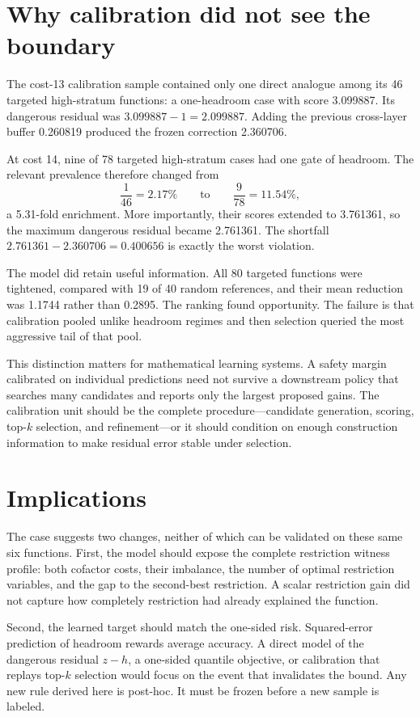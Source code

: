 \documentclass[11pt]{article}
\begin{document}
\section{Why calibration did not see the boundary}

The cost-13 calibration sample contained only one direct analogue among its
46 targeted high-stratum functions: a one-headroom case with score 3.099887.
Its dangerous residual was $3.099887-1=2.099887$.  Adding the previous
cross-layer buffer 0.260819 produced the frozen correction 2.360706.

At cost 14, nine of 78 targeted high-stratum cases had one gate of headroom.
The relevant prevalence therefore changed from
\[
 \frac{1}{46}=2.17\%\qquad\text{to}\qquad
 \frac{9}{78}=11.54\%,
\]
a 5.31-fold enrichment.  More importantly, their scores extended to 3.761361,
so the maximum dangerous residual became 2.761361.  The shortfall
$2.761361-2.360706=0.400656$ is exactly the worst violation.

The model did retain useful information.  All 80 targeted functions were
tightened, compared with 19 of 40 random references, and their mean reduction
was 1.1744 rather than 0.2895.  The ranking found opportunity.  The failure is
that calibration pooled unlike headroom regimes and then selection queried
the most aggressive tail of that pool.

This distinction matters for mathematical learning systems.  A safety margin
calibrated on individual predictions need not survive a downstream policy
that searches many candidates and reports only the largest proposed gains.
The calibration unit should be the complete procedure---candidate generation,
scoring, top-$k$ selection, and refinement---or it should condition on enough
construction information to make residual error stable under selection.

\section{Implications}

The case suggests two changes, neither of which can be validated on these same
six functions.  First, the model should expose the complete restriction
witness profile: both cofactor costs, their imbalance, the number of optimal
restriction variables, and the gap to the second-best restriction.  A scalar
restriction gain did not capture how completely restriction had already
explained the function.

Second, the learned target should match the one-sided risk.  Squared-error
prediction of headroom rewards average accuracy.  A direct model of the
dangerous residual $z-h$, a one-sided quantile objective, or calibration that
replays top-$k$ selection would focus on the event that invalidates the bound.
Any new rule derived here is post-hoc.  It must be frozen before a new sample
is labeled.
\end{document}
